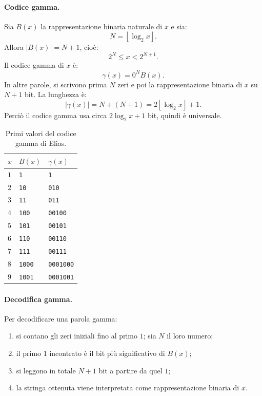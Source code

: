\documentclass{article}
\theoremstyle{definition}
\numberwithin{equation}{section}
\begin{document}
\paragraph{Codice gamma.}
Sia $B(x)$ la rappresentazione binaria naturale di $x$ e sia:
\[
    N=\left\lfloor\log_2 x\right\rfloor.
\]
Allora $|B(x)|=N+1$, cioè:
\[
    2^N\leq x<2^{N+1}.
\]
Il codice gamma di $x$ è:
\begin{equation}\label{eq:gamma_code}
    \gamma(x)=0^N B(x).
\end{equation}
In altre parole, si scrivono prima $N$ zeri e poi la rappresentazione binaria di $x$ su $N+1$ bit. La lunghezza è:
\begin{equation}\label{eq:gamma_length}
    |\gamma(x)|
    =
    N+(N+1)
    =
    2\left\lfloor\log_2 x\right\rfloor+1.
\end{equation}
Perciò il codice gamma usa circa $2\log_2 x+1$ bit, quindi è universale.

\begin{table}[htpb]
    \centering
    \small
    \begin{tabular}{|l|l|l|}
        \hline
        \textbf{$x$} & \textbf{$B(x)$} & \textbf{$\gamma(x)$} \\ \hline
        $1$          & \texttt{1}      & \texttt{1}           \\ \hline
        $2$          & \texttt{10}     & \texttt{010}         \\ \hline
        $3$          & \texttt{11}     & \texttt{011}         \\ \hline
        $4$          & \texttt{100}    & \texttt{00100}       \\ \hline
        $5$          & \texttt{101}    & \texttt{00101}       \\ \hline
        $6$          & \texttt{110}    & \texttt{00110}       \\ \hline
        $7$          & \texttt{111}    & \texttt{00111}       \\ \hline
        $8$          & \texttt{1000}   & \texttt{0001000}     \\ \hline
        $9$          & \texttt{1001}   & \texttt{0001001}     \\ \hline
    \end{tabular}
    \caption{Primi valori del codice gamma di Elias.}
    \label{tab:gamma_codewords}
\end{table}

\paragraph{Decodifica gamma.}
Per decodificare una parola gamma:
\begin{enumerate}
    \item si contano gli zeri iniziali fino al primo $1$; sia $N$ il loro numero;
    \item il primo $1$ incontrato è il bit più significativo di $B(x)$;
    \item si leggono in totale $N+1$ bit a partire da quel $1$;
    \item la stringa ottenuta viene interpretata come rappresentazione binaria di $x$.
\end{enumerate}
\end{document}
